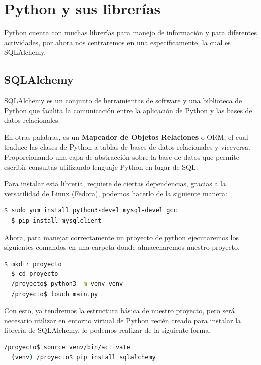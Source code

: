 \documentclass[12pt]{article}
\begin{document}
\section{Python y sus librerías}

Python cuenta con muchas librerías para manejo de información y para diferentes actividades, por ahora nos centraremos en una específicamente, la cual es SQLAlchemy.

\subsection{SQLAlchemy}

SQLAlchemy es un conjunto de herramientas de software y una biblioteca de Python que facilita la comunicación entre la aplicación de Python y las bases de datos relacionales. 

En otras palabras, es un \textbf{Mapeador de Objetos Relaciones} o ORM, el cual traduce las clases de Python a tablas de bases de datos relacionales y viceversa. Proporcionando una capa de abstracción sobre la base de datos que permite escribir consultas utilizando lenguaje Python en lugar de SQL.

Para instalar esta librería, requiere de ciertas dependencias, gracias a la versatilidad de Linux (Fedora), podemos hacerlo de la siguiente manera:

\begin{lstlisting}[language=Bash]
  $ sudo yum install python3-devel mysql-devel gcc
  $ pip install mysqlclient
\end{lstlisting}

Ahora, para manejar correctamente un proyecto de python ejecutaremos los siguientes comandos en una carpeta donde almacenaremos nuestro proyecto.

\begin{lstlisting}[language=Bash]
  $ mkdir proyecto
  $ cd proyecto
  /proyecto$ python3 -m venv venv
  /proyecto$ touch main.py
\end{lstlisting}
\vspace{12pt}

Con esto, ya tendremos la estructura básica de nuestro proyecto, pero será necesario utilizar en entorno virtual de Python recién creado para instalar la librería de SQLAlchemy, lo podemos realizar de la siguiente forma.

\begin{lstlisting}[language=Bash]
  /proyecto$ source venv/bin/activate
  (venv) /proyecto$ pip install sqlalchemy
\end{lstlisting}
\vspace{12pt}
\end{document}
